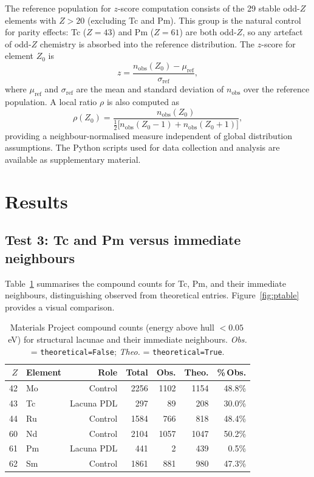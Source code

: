 \documentclass[11pt,a4paper]{article}
\theoremstyle{definition}
\theoremstyle{remark}
\begin{document}
The reference population for $z$-score computation consists of the 29 stable odd-$Z$ elements with $Z>20$ (excluding Tc and Pm). This group is the natural control for parity effects: Tc ($Z=43$) and Pm ($Z=61$) are both odd-$Z$, so any artefact of odd-$Z$ chemistry is absorbed into the reference distribution. The $z$-score for element $Z_0$ is
\begin{equation}
  z = \frac{n_{\mathrm{obs}}(Z_0) - \mu_{\mathrm{ref}}}{\sigma_{\mathrm{ref}}},
  \label{eq:zscore}
\end{equation}
where $\mu_{\mathrm{ref}}$ and $\sigma_{\mathrm{ref}}$ are the mean and standard deviation of $n_{\mathrm{obs}}$ over the reference population. A local ratio $\rho$ is also computed as
\begin{equation}
  \rho(Z_0) = \frac{n_{\mathrm{obs}}(Z_0)}{\tfrac{1}{2}\bigl[n_{\mathrm{obs}}(Z_0-1) + n_{\mathrm{obs}}(Z_0+1)\bigr]},
  \label{eq:ratio}
\end{equation}
providing a neighbour-normalised measure independent of global distribution assumptions. The Python scripts used for data collection and analysis are available as supplementary material.

\section{Results}
\label{sec:results}

\subsection{Test 3: Tc and Pm versus immediate neighbours}

Table~\ref{tab:test3} summarises the compound counts for Tc, Pm, and their immediate neighbours, distinguishing observed from theoretical entries. Figure~\ref{fig:ptable} provides a visual comparison.

\begin{table}[ht]
\centering
\caption{Materials Project compound counts (energy above hull $<0.05$\,eV) for structural lacunae and their immediate neighbours. \emph{Obs.} = \texttt{theoretical=False}; \emph{Theo.} = \texttt{theoretical=True}.}
\label{tab:test3}
\renewcommand{\arraystretch}{1.25}
\begin{tabular}{rlrrrrr}
\toprule
$Z$ & Element & Role & Total & Obs. & Theo. & \%\,Obs. \\
\midrule
42 & Mo & Control & 2256 & 1102 & 1154 & 48.8\% \\
\rowcolor{lccolor}
43 & Tc & Lacuna PDL & 297 &   89 &  208 & 30.0\% \\
44 & Ru & Control & 1584 &  766 &  818 & 48.4\% \\
\midrule
60 & Nd & Control & 2104 & 1057 & 1047 & 50.2\% \\
\rowcolor{lccolor}
61 & Pm & Lacuna PDL & 441 &    2 &  439 &  0.5\% \\
62 & Sm & Control & 1861 &  881 &  980 & 47.3\% \\
\bottomrule
\end{tabular}
\end{table}
\end{document}
